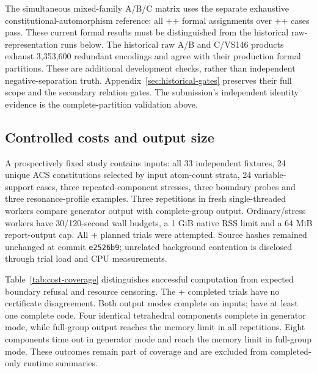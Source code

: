 \documentclass[pdflatex,sn-mathphys-num,referee,lineno]{sn-jnl}
\newcommand{\FormalAllAssignments}{\the\numexpr\FormalAAssignments+\FormalBAssignments+\FormalCAssignments\relax}
\newcommand{\FormalAllCases}{\the\numexpr\FormalACases+\FormalBCases+\FormalCCases\relax}
\newcommand{\code}[1]{\texttt{#1}}
\theoremstyle{plain}
\theoremstyle{remark}
\theoremstyle{definition}
\begin{document}
The simultaneous mixed-family A/B/C matrix uses the separate exhaustive
constitutional-automorphism reference: all \FormalAllAssignments{} formal
assignments over \FormalAllCases{} cases pass. These current formal results
must be distinguished from the historical raw-representation runs below.
The historical raw A/B and C/VS146 products exhaust 3,353,600 redundant
encodings and agree with their production formal partitions. These are
additional development checks, rather than independent negative-separation
truth. Appendix~\ref{sec:historical-gates} preserves their full scope and the
secondary relation gates. The submission's independent identity evidence is
the complete-partition validation above.

\subsection{Controlled costs and output size}
\label{sec:controlled-costs}

A prospectively fixed study contains \CostInputCases{} inputs: all 33
independent fixtures, 24 unique ACS constitutions selected by input atom-count
strata, 24 variable-support cases, three repeated-component stresses, three
boundary probes and three resonance-profile examples. Three repetitions in
fresh single-threaded workers compare generator output with complete-group
output. Ordinary/stress workers have 30/120-second wall budgets, a 1 GiB native
RSS limit and a 64 MiB report-output cap. All
\number\numexpr\CostGeneratorTrials+\CostFullGroupTrials\relax{} planned
trials were attempted. Source hashes remained unchanged at commit
\code{e2526b9}; unrelated background contention is disclosed through trial
load and CPU measurements.

Table~\ref{tab:cost-coverage} distinguishes successful computation from
expected boundary refusal and resource censoring. The
\number\numexpr\CostGeneratorComplete+\CostFullGroupComplete\relax{}
completed trials have no certificate disagreement. Both output modes complete
on \CostCasesBothModes{} inputs; \CostCasesWithCode{} have at least one
complete code. Four identical tetrahedral components complete in generator
mode, while full-group output reaches the memory limit in all repetitions. Eight components
time out in generator mode and reach the memory limit in full-group mode.
These outcomes remain part of coverage and are excluded from completed-only
runtime summaries.
\end{document}
